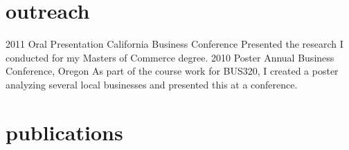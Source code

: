 \documentclass[]{k-cv} %
\begin{document}
\section{outreach}

\begin{entrylist}
\entry
{2011}
{Oral Presentation}
{California Business Conference}
{Presented the research I conducted for my Masters of Commerce degree.}
\entry
{2010}
{Poster}
{Annual Business Conference, Oregon}
{As part of the course work for BUS320, I created a poster analyzing several 
local businesses and presented this at a conference.}
\end{entrylist}


\section{publications}
\end{document}
